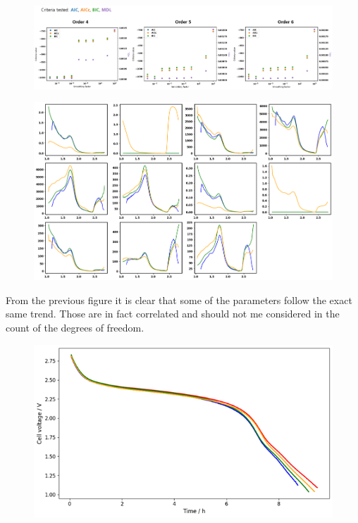 \begin{figure}[h]
    \centering
    \includegraphics[width=\linewidth]{figures/application4/image7.png}
\restoregeometry
\end{figure}


\begin{figure}[h]
    \includegraphics[width=\textwidth]{figures/application4/image8.png}
\restoregeometry
\end{figure}

From the previous figure it is clear that some of the parameters follow the exact same trend. Those are in fact correlated and should not me considered in the count of the degrees of freedom.

\begin{figure}[h]
    \centering
    \includegraphics[width=\linewidth]{figures/application4/image9.png}
\end{figure}

